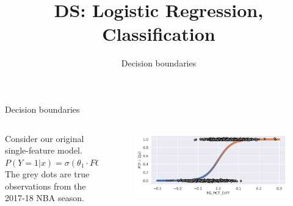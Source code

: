 \documentclass[aspectratio=169]{../latex_main/tntbeamer}  %
\title[Introduction]{DS: Logistic Regression, Classification}
\subtitle{Decision boundaries}
\begin{document}
	
	\maketitle
	\begin{frame}{Decision boundaries}
	    \begin{columns}
	        \begin{column}{.5\textwidth}
	            Consider our original single-feature model.\\
	            \bigskip
	            $P(Y=1|x) = \sigma (\theta_1 \cdot FG\_PCT\_DIFF)$\\
	            \bigskip
	            The grey dots are true observations from the 2017-18 NBA season.
	             
	        \end{column}
	        
	        
	        \begin{column}{.5\textwidth}
	                \begin{figure}
	                    \centering
	                    \includegraphics[scale=.55]{Bild33}\\
	                \end{figure}
	        \end{column}
	        
	    \end{columns}
	\end{frame}
	
\end{document}
